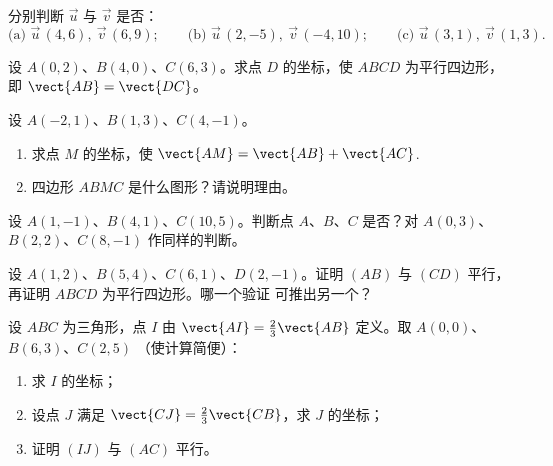 \begin{exercise}[$\star$]\label{exo:g10:vectors:4}
分别判断 $\vec u$ 与 $\vec v$ 是否：
\[
\text{(a) } \vec u\,(4, 6),\ \vec v\,(6, 9);
\qquad
\text{(b) } \vec u\,(2, -5),\ \vec v\,(-4, 10);
\qquad
\text{(c) } \vec u\,(3, 1),\ \vec v\,(1, 3).
\]
\end{exercise}

\begin{exercise}[$\star$]\label{exo:g10:vectors:5}
设 $A(0, 2)$、$B(4, 0)$、$C(6, 3)$。求点
$D$ 的坐标，使 $ABCD$ 为平行四边形，即
$\vect{AB} = \vect{DC}$。
\end{exercise}

\begin{exercise}[$\star\star$]\label{exo:g10:vectors:6}
设 $A(-2, 1)$、$B(1, 3)$、$C(4, -1)$。
\begin{enumerate}
  \item 求点 $M$ 的坐标，使
        $\vect{AM} = \vect{AB} + \vect{AC}$.
  \item 四边形 $ABMC$ 是什么图形？请说明理由。
\end{enumerate}
\end{exercise}

\begin{exercise}[$\star\star$]\label{exo:g10:vectors:7}
设 $A(1, -1)$、$B(4, 1)$、$C(10, 5)$。判断点 $A$、$B$、$C$
是否？对 $A(0, 3)$、$B(2, 2)$、$C(8, -1)$ 作同样的判断。
\end{exercise}

\begin{exercise}[$\star\star$]\label{exo:g10:vectors:8}
设 $A(1, 2)$、$B(5, 4)$、$C(6, 1)$、$D(2, -1)$。证明 $(AB)$ 与
$(CD)$ 平行，再证明 $ABCD$ 为平行四边形。哪一个验证
可推出另一个？
\end{exercise}

\begin{exercise}[$\star\star$]\label{exo:g10:vectors:9}
设 $ABC$ 为三角形，点 $I$ 由
$\vect{AI} = \frac23 \vect{AB}$ 定义。取 $A(0,0)$、$B(6, 3)$、$C(2, 5)$
（使计算简便）：
\begin{enumerate}
  \item 求 $I$ 的坐标；
  \item 设点 $J$ 满足 $\vect{CJ} = \frac23\vect{CB}$，求
        $J$ 的坐标；
  \item 证明 $(IJ)$ 与 $(AC)$ 平行。
\end{enumerate}
\end{exercise}

